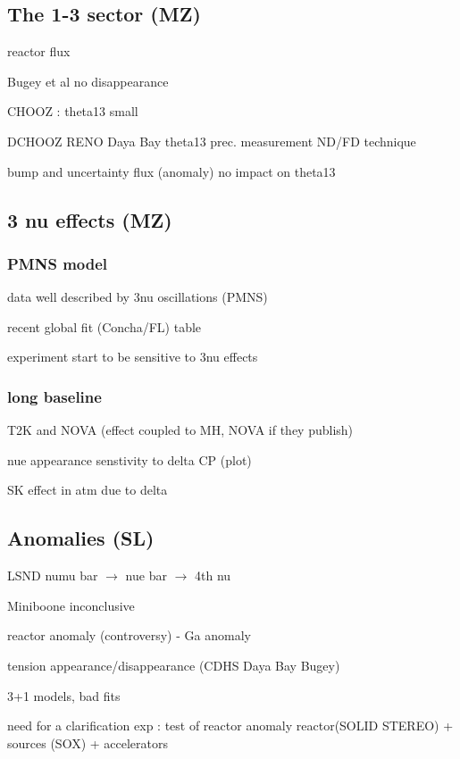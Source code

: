 \documentclass[preprint,12pt]{elsarticle}
\begin{document}
\subsection{The 1-3 sector (MZ)}



reactor flux

Bugey et al no disappearance

CHOOZ : theta13 small

DCHOOZ RENO Daya Bay theta13 prec. measurement ND/FD technique

bump and uncertainty flux (anomaly) no impact on theta13

\subsection{ 3 nu effects (MZ)}

\subsubsection{ PMNS model}

data well described by 3nu oscillations (PMNS)

recent global fit (Concha/FL) table

experiment start to be sensitive to 3nu effects

\subsubsection{ long baseline}

T2K and NOVA (effect coupled to MH, NOVA if they publish)

nue appearance senstivity to delta CP (plot)

SK effect in atm due to delta

\subsection{Anomalies (SL)}

LSND numu bar  $\rightarrow$ nue bar  $\rightarrow$ 4th nu

Miniboone inconclusive

reactor anomaly (controversy) - Ga anomaly

tension appearance/disappearance (CDHS Daya Bay Bugey)

3+1 models, bad fits

need for a clarification exp : test of reactor anomaly reactor(SOLID STEREO) + sources (SOX) + accelerators
\end{document}
